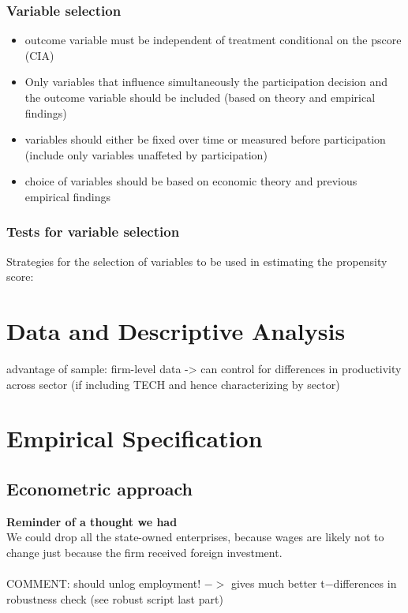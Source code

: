 \documentclass[a4paper,12pt]{scrartcl}
\begin{document}
\subsubsection*{Variable selection}
\begin{itemize}
\item outcome variable must be independent of treatment conditional on the pscore (CIA)
\item Only variables that influence simultaneously the participation decision and the outcome variable should be included (based on theory and empirical findings)
\item variables should either be fixed over time or measured before participation (include only variables unaffeted by participation)
\item choice of variables should be based on economic theory and previous empirical findings
\end{itemize}

\subsubsection*{Tests for variable selection}
Strategies for the selection of variables to be used in estimating the propensity score:



\section{Data and Descriptive Analysis}

advantage of sample: firm-level data -> can control for differences in productivity across sector (if including TECH and hence characterizing by sector)

\section{Empirical Specification}
\subsection{Econometric approach}
\textbf{Reminder of a thought we had}\\
We could drop all the state-owned enterprises, because wages are likely not to change just because the firm received foreign investment. \\\\
COMMENT: should unlog employment! $->$ gives much better t$-$differences in robustness check (see robust script last part)\\
\end{document}
